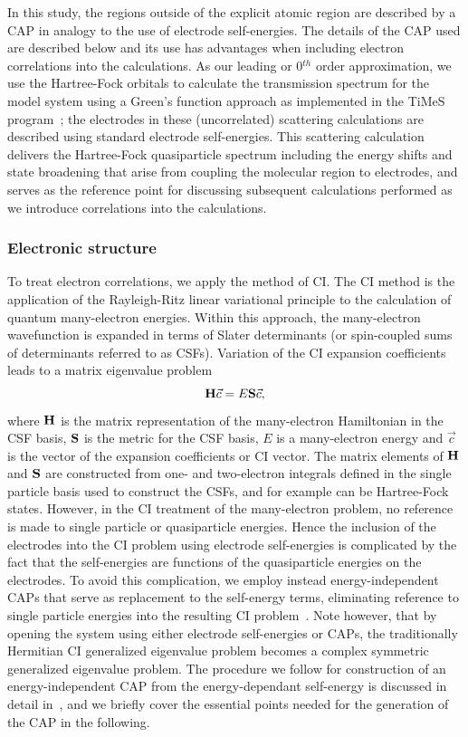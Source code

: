 In this study, the regions outside of the explicit atomic region are
described by a \ac{CAP} in analogy to the use of electrode self-energies.
The details of the \ai \ac{CAP} used are described below and its use has
advantages when including electron correlations into the calculations.
As our leading or 0$^{th}$ order approximation, we use the Hartree-Fock
orbitals to calculate the transmission spectrum for the model system using
a Green's function approach  as implemented in the TiMeS program~\cite{times};
the electrodes in these (uncorrelated) scattering calculations are
described using standard electrode  self-energies. This scattering
calculation delivers the Hartree-Fock quasiparticle spectrum including
the energy shifts and state broadening that arise from coupling the molecular
region to electrodes, and serves as the reference point for discussing
subsequent calculations performed as we introduce correlations into the
calculations. 

\subsubsection{Electronic structure}
To treat electron correlations, we apply the method of \ac{CI}. The \ac{CI}
method is the application of the  Rayleigh-Ritz linear variational
principle to the calculation of quantum many-electron  energies. Within
this approach, the many-electron wavefunction is expanded in terms  of
Slater determinants (or spin-coupled sums of determinants referred to as
\acp{CSF}).  Variation of the \ac{CI} expansion coefficients leads to a
matrix eigenvalue problem
\begin{equation}
\mathbf{H} \vec{c} = E \mathbf{S} \vec{c},
\end{equation} 
where $\mathbf{H}$ is the matrix representation of the many-electron
Hamiltonian in the CSF basis, $\mathbf{S}$ is the metric for the CSF basis,
$E$ is a many-electron energy and $\vec{c}$ is the vector of the
expansion coefficients or CI vector. The matrix elements of $\mathbf{H}$
and $\mathbf{S}$ are constructed from one- and two-electron integrals
defined in the single particle basis used to construct the CSFs, and for
example can be Hartree-Fock states. However, in the CI treatment of the
many-electron problem, no reference is made to single particle or
quasiparticle energies. Hence the inclusion of the electrodes into the
CI problem using electrode self-energies is complicated by the fact that
the self-energies are functions of the quasiparticle energies on the
electrodes. To avoid this complication, we employ instead energy-independent
\acp{CAP} that serve as replacement to the self-energy terms, eliminating
reference to single particle energies into the resulting \ac{CI}
problem~\cite{riss_meyer,santracederbaum,muga2004,henderson,varga2008}.
Note however, that by opening the system using either electrode self-energies
or \acp{CAP},  the traditionally Hermitian \ac{CI} generalized eigenvalue
problem becomes a complex symmetric generalized eigenvalue problem. The
procedure we follow for construction of an energy-independent \ai \ac{CAP} 
from the energy-dependant self-energy is discussed in detail
in~\cite{henderson}, and we briefly cover the essential points needed
for the generation of the \ac{CAP} in the following.

